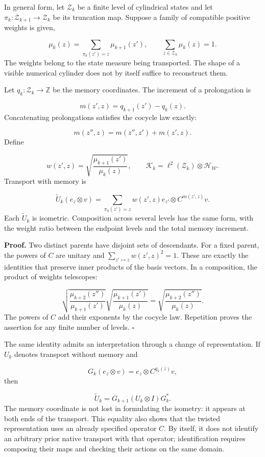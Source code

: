 In general form, let \(\mathcal Z_k\) be a finite level of cylindrical states and let \(\pi_k:\mathcal Z_{k+1}\to\mathcal Z_k\) be its truncation map. Suppose a family of compatible positive weights is given,

\[
\mu_k(z)=\sum_{\pi_k(z')=z}\mu_{k+1}(z'),
\qquad \sum_{z\in\mathcal Z_k}\mu_k(z)=1.
\]
The weights belong to the state measure being transported. The shape of a visible numerical cylinder does not by itself suffice to reconstruct them.

Let \(q_k:\mathcal Z_k\to\mathbb Z\) be the memory coordinates. The increment of a prolongation is

\[
m(z',z)=q_{k+1}(z')-q_k(z).
\]
Concatenating prolongations satisfies the cocycle law exactly:

\[
m(z'',z)=m(z'',z')+m(z',z).
\]
Define

\[
w(z',z)=
\sqrt{\frac{\mu_{k+1}(z')}{\mu_k(z)}},
\qquad
\mathcal K_k=\ell^2(\mathcal Z_k)\otimes\mathcal H_{\mathscr W}.
\]
Transport with memory is

\[
\widetilde U_k(e_z\otimes v)
=\sum_{\pi_k(z')=z}w(z',z)e_{z'}\otimes C^{m(z',z)}v.
\]
Each \(\widetilde U_k\) is isometric. Composition across several levels has the same form, with the weight ratio between the endpoint levels and the total memory increment.

\textbf{Proof.} Two distinct parents have disjoint sets of descendants. For a fixed parent, the powers of \(C\) are unitary and \(\sum_{z'\mapsto z}w(z',z)^2=1\). These are exactly the identities that preserve inner products of the basis vectors. In a composition, the product of weights telescopes:

\[
\sqrt{\frac{\mu_{k+2}(z'')}{\mu_{k+1}(z')}}
\sqrt{\frac{\mu_{k+1}(z')}{\mu_k(z)}}
=\sqrt{\frac{\mu_{k+2}(z'')}{\mu_k(z)}}.
\]
The powers of \(C\) add their exponents by the cocycle law. Repetition proves the assertion for any finite number of levels. \hfill\(\square\)

The same identity admits an interpretation through a change of representation. If \(U_k\) denotes transport without memory and

\[
G_k(e_z\otimes v)=e_z\otimes C^{q_k(z)}v,
\]
then

\[
\widetilde U_k=G_{k+1}(U_k\otimes I)G_k^*.
\]
The memory coordinate is not lost in formulating the isometry: it appears at both ends of the transport. This equality also shows that the twisted representation uses an already specified operator \(C\). By itself, it does not identify an arbitrary prior native transport with that operator; identification requires composing their maps and checking their actions on the same domain.

